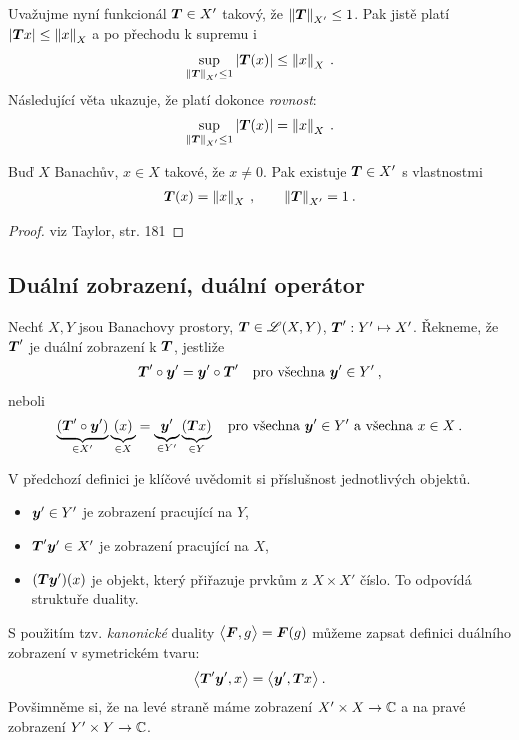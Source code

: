 Uvažujme nyní funkcionál $\boldsymbol{T} \in X'$ takový, že $\left\lVert\boldsymbol{T}\right\rVert_{X'} \leq 1$. Pak jistě platí $|\boldsymbol{T} x| \leq \left\lVert x\right\rVert_X$ a po přechodu k supremu i \begin{align*}
    \sup_{\left\lVert\boldsymbol{T}\right\rVert_{X'} \leq 1} |\boldsymbol{T}(x)| \leq \left\lVert x\right\rVert_X \:.
\end{align*}
Následující věta ukazuje, že platí dokonce \textit{rovnost}: \begin{align*}
    \sup_{\left\lVert\boldsymbol{T}\right\rVert_{X'} \leq 1} |\boldsymbol{T}(x)| = \left\lVert x\right\rVert_X \:.
\end{align*}

\begin{theorem}
Buď $X$ Banachův, $x \in X$ takové, že $x \neq 0$. Pak existuje $\boldsymbol{T} \in X'$ s vlastnostmi \begin{align*}
    \boldsymbol{T}(x) = \left\lVert x\right\rVert_X \:, \qquad \left\lVert\boldsymbol{T}\right\rVert_{X'} = 1 \:.
\end{align*}
\end{theorem}
\begin{proof}
viz Taylor, str. 181
\end{proof}

\subsection{Duální zobrazení, duální operátor}

\begin{definition}
Nechť $X,Y$ jsou Banachovy prostory, $\boldsymbol{T} \in \mathscr{L} (X,Y)$, $\boldsymbol{T}' : Y' \mapsto X'$. Řekneme, že $\boldsymbol{T}'$ je duální zobrazení k $\boldsymbol{T}$, jestliže \begin{align*}
    \boldsymbol{T}' \circ \boldsymbol{y}' = \boldsymbol{y}' \circ \boldsymbol{T}' \quad \text{pro všechna } \boldsymbol{y}' \in Y' \:,
\end{align*}
neboli \begin{align*}
    \underbrace{(\boldsymbol{T}' \circ \boldsymbol{y}')}_{\in X'} \underbrace{(x)}_{\in X} = \underbrace{\boldsymbol{y}'}_{\in Y'} \underbrace{(\boldsymbol{T} x)}_{\in Y} \quad \text{pro všechna } \boldsymbol{y}' \in Y' \text{ a všechna } x \in X \:.
\end{align*}
\end{definition}

V předchozí definici je klíčové uvědomit si příslušnost jednotlivých objektů. \begin{itemize}
    \item $\boldsymbol{y}' \in Y'$ je zobrazení pracující na $Y$,
    \item $\boldsymbol{T}' \boldsymbol{y}' \in X'$ je zobrazení pracující na $X$,
    \item $(\boldsymbol{T} \boldsymbol{y}')(x)$ je objekt, který přiřazuje prvkům z $X \times X'$ číslo. To odpovídá struktuře duality.
\end{itemize}
S použitím tzv. \textit{kanonické} duality $\big< \boldsymbol{F}, g \big> = \boldsymbol{F}(g)$ můžeme zapsat definici duálního zobrazení v symetrickém tvaru:
\begin{align*}
    \big< \boldsymbol{T}' \boldsymbol{y}', x \big> = \big< \boldsymbol{y}', \boldsymbol{T} x \big> \: .
\end{align*}
Povšimněme si, že na levé straně máme zobrazení $X' \times X \to \mathbb{C}$ a na pravé zobrazení $Y' \times Y \to \mathbb{C}$.

